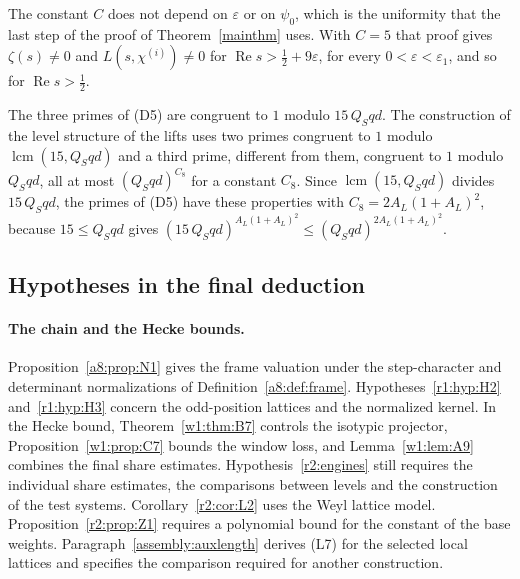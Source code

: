 The constant $C$ does not depend on $\varepsilon$ or on $\psi_0$, which is the uniformity that the last step of the proof of Theorem~\ref{mainthm} uses. With $C=5$ that proof gives $\zeta(s)\ne0$ and $L(s,\chi^{(i)})\ne0$ for $\operatorname{Re}s>\frac12+9\varepsilon$, for every $0<\varepsilon<\varepsilon_1$, and so for $\operatorname{Re}s>\frac12$.

The three primes of (D5) are congruent to $1$ modulo $15\,Q_Sqd$. The construction of the level structure of the lifts uses two primes congruent to $1$ modulo $\operatorname{lcm}(15,Q_Sqd)$ and a third prime, different from them, congruent to $1$ modulo $Q_Sqd$, all at most $(Q_Sqd)^{C_8}$ for a constant $C_8$. Since $\operatorname{lcm}(15,Q_Sqd)$ divides $15\,Q_Sqd$, the primes of (D5) have these properties with $C_8=2A_L(1+A_L)^2$, because $15\le Q_Sqd$ gives $(15\,Q_Sqd)^{A_L(1+A_L)^2}\le(Q_Sqd)^{2A_L(1+A_L)^2}$.

\subsection{Hypotheses in the final deduction}\label{sec:frontier}



\paragraph{The chain and the Hecke bounds.}\label{fr:sec:chain}\label{fr:sec:loss}
Proposition~\ref{a8:prop:N1} gives the frame valuation under the step-character
and determinant normalizations of Definition~\ref{a8:def:frame}.
Hypotheses~\ref{r1:hyp:H2} and~\ref{r1:hyp:H3} concern the odd-position
lattices and the normalized kernel. In the Hecke bound, Theorem~\ref{w1:thm:B7}
controls the isotypic projector, Proposition~\ref{w1:prop:C7} bounds the
window loss, and Lemma~\ref{w1:lem:A9} combines the final share estimates.
Hypothesis~\ref{r2:engines} still requires the individual share estimates,
the comparisons between levels and the construction of the test systems.
Corollary~\ref{r2:cor:L2} uses the Weyl lattice model. Proposition~\ref{r2:prop:Z1}
requires a polynomial bound for the constant of the base weights.
Paragraph~\ref{assembly:auxlength} derives (L7) for the selected local lattices and specifies the comparison required for another construction.

